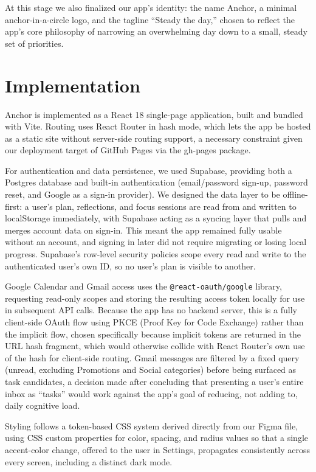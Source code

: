 \documentclass[sigplan,screen]{acmart}
\begin{document}
At this stage we also finalized our app's identity: the name Anchor, a minimal anchor-in-a-circle logo, and the tagline ``Steady the day,'' chosen to reflect the app's core philosophy of narrowing an overwhelming day down to a small, steady set of priorities.

\section{Implementation}
Anchor is implemented as a React 18 single-page application, built and bundled with Vite. Routing uses React Router in hash mode, which lets the app be hosted as a static site without server-side routing support, a necessary constraint given our deployment target of GitHub Pages via the gh-pages package.

For authentication and data persistence, we used Supabase, providing both a Postgres database and built-in authentication (email/password sign-up, password reset, and Google as a sign-in provider). We designed the data layer to be offline-first: a user's plan, reflections, and focus sessions are read from and written to localStorage immediately, with Supabase acting as a syncing layer that pulls and merges account data on sign-in. This meant the app remained fully usable without an account, and signing in later did not require migrating or losing local progress. Supabase's row-level security policies scope every read and write to the authenticated user's own ID, so no user's plan is visible to another.

Google Calendar and Gmail access uses the \texttt{@react-oauth/}\allowbreak\texttt{google} library, requesting read-only scopes and storing the resulting access token locally for use in subsequent API calls. Because the app has no backend server, this is a fully client-side OAuth flow using PKCE (Proof Key for Code Exchange) rather than the implicit flow, chosen specifically because implicit tokens are returned in the URL hash fragment, which would otherwise collide with React Router's own use of the hash for client-side routing. Gmail messages are filtered by a fixed query (unread, excluding Promotions and Social categories) before being surfaced as task candidates, a decision made after concluding that presenting a user's entire inbox as ``tasks'' would work against the app's goal of reducing, not adding to, daily cognitive load.

Styling follows a token-based CSS system derived directly from our Figma file, using CSS custom properties for color, spacing, and radius values so that a single accent-color change, offered to the user in Settings, propagates consistently across every screen, including a distinct dark mode.
\end{document}
